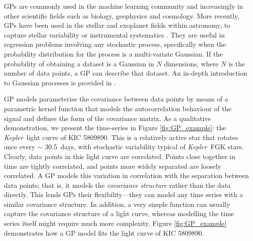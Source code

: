 \documentclass[useAMS, usenatbib, preprint, 12pt]{aastex}
\newcommand{\Kepler}{{\it Kepler}}
\newcommand{\kepler}{\Kepler}
\newcommand{\eg}{{\it e.g.}}
\newcommand{\kepexample}{5809890}
\newcommand{\kepexampleperiod}{30.5}
\begin{document}
GPs are commonly used in the machine learning community and increasingly
in other scientific fields such as biology, geophysics and cosmology.
More recently, GPs have been used in the stellar and exoplanet fields within
astronomy, to capture stellar variability or instrumental systematics
\citep[see \eg][]{Gibson2012, Haywood2014, Dawson2014, Barclay2015,
Haywood2015, Evans2015, Rajpaul2015, Rajpaul2016, Aigrain2016}.
They are useful in regression problems involving any stochastic process,
specifically when the probability distribution for the process is a
multi-variate Gaussian.
If the probability of obtaining a dataset is a Gaussian in $N$ dimensions,
where $N$ is the number of data points, a GP can describe that dataset.
An in-depth introduction to Gaussian processes is provided in
\citet{Rasmussen2005}.

GP models parameterise the covariance between data points by means of a
parametric kernel function that models the autocorrelation behaviour of the
signal and defines the form of the covariance matrix.
As a qualitative demonstration, we present the time-series in Figure
\ref{fig:GP_example}: the \kepler\ light curve of KIC \kepexample.
This is a relatively active star that rotates once every $\sim$
\kepexampleperiod\ days, with stochastic variability typical of \kepler\ FGK
stars.
Clearly, data points in this light curve are correlated.
Points close together in time are tightly correlated, and points more
widely separated are loosely correlated.
A GP models this variation in correlation with the separation between data
points; that is, it models the {\it covariance structure} rather than the data
directly.
This lends GPs their flexibility---they can model any time
series with a similar covariance structure.
In addition, a very simple function can usually capture the covariance
structure of a light curve, whereas modelling the time series itself
might require much more complexity.
Figure \ref{fig:GP_example} demonstrates how a GP model fits the light curve of
KIC \kepexample.
\end{document}
